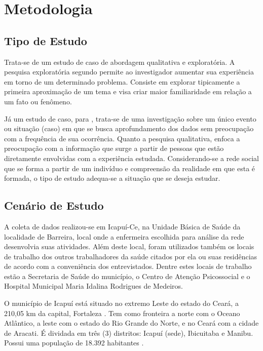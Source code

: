\chapter{Metodologia}
\label{chap:metodologia}

\section{Tipo de Estudo}
Trata-se de um estudo de caso de abordagem qualitativa e exploratória. A pesquisa exploratória segundo  permite ao investigador aumentar sua experiência em torno de um determinado problema. Consiste em explorar tipicamente a primeira aproximação de um tema e visa criar maior familiaridade em relação a um fato ou fenômeno. 

Já um estudo de caso, para , trata-se de uma investigação sobre um único evento ou situação (caso) em que se busca aprofundamento dos dados  sem preocupação com a frequência de sua ocorrência. Quanto a pesquisa qualitativa,  enfoca a preocupação com a informação que surge a partir de pessoas que estão diretamente envolvidas com a experiência estudada. Considerando-se a rede social que se forma a partir de um indivíduo e compreensão da realidade em que esta é formada, o tipo de estudo adequa-se a situação que se deseja estudar.

\section{Cenário de Estudo}
A coleta de dados realizou-se em Icapuí-Ce, na Unidade Básica de Saúde da localidade de Barreira, local onde a enfermeira escolhida para análise da rede desenvolvia suas atividades. Além deste local, foram utilizados também os locais de trabalho dos outros trabalhadores da saúde citados por ela ou suas residências de acordo com a conveniência dos entrevistados. Dentre estes locais de trabalho estão a Secretaria de Saúde do município, o Centro de Atenção Psicossocial e o Hospital Municipal Maria Idalina Rodrigues de Medeiros. 

O município de Icapuí está situado no extremo Leste do estado do Ceará, a 210,05 km da capital, Fortaleza \cite{der}. Tem como fronteira a norte com o Oceano Atlântico, a leste com o estado do Rio Grande do Norte, e no Ceará com a cidade de Aracati. É dividada em três (3) distritos: Icapuí (sede), Ibicuitaba e Manibu. Possui uma população de 18.392 habitantes \cite{censo2010disponivel}.
  
